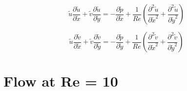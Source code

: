 \documentclass[11pt]{article}
\begin{document}
\begin{equation*}
    \tilde{u} \frac{\partial \tilde{u}}{\partial \tilde{x}} + \tilde{v} \frac{\partial \tilde{u}}{\partial \tilde{y}} = -\frac{\partial \tilde{p}}{\partial \tilde{x}} + \frac{1}{Re}\left(\frac{\partial^2 \tilde{u}}{\partial \tilde{x}^2} + \frac{\partial^2 \tilde{u}}{\partial \tilde{y}^2}\right)
\end{equation*}

\begin{equation*}
    \tilde{u} \frac{\partial \tilde{v}}{\partial \tilde{x}} + \tilde{v} \frac{\partial \tilde{v}}{\partial \tilde{y}} = -\frac{\partial \tilde{p}}{\partial \tilde{y}} + \frac{1}{Re}\left(\frac{\partial^2 \tilde{v}}{\partial \tilde{x}^2} + \frac{\partial^2 \tilde{v}}{\partial \tilde{y}^2}\right)
\end{equation*}

\pagebreak



\section{Flow at Re = 10}
\end{document}
